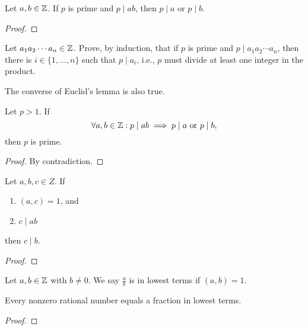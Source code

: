 \documentclass[11pt,a5paper]{article}
\begin{document}
\begin{teo}
    Let \(a,b\in \mathbb{Z}\).
    If \(p\) is prime and \(p\mid ab\), then \(p\mid a\) or \(p\mid b\).
\end{teo}

\begin{proof}
    
\end{proof}

\begin{eje}
    Let \(a_1 a_2 \cdots a_n\in \mathbb{Z}\).
    Prove, by induction, that if \(p\) is prime and \(p\mid a_1 a_2 \cdots a_n\), then there is \(i\in \{1,\ldots,n\}\) such that \(p\mid a_i\), i.e., \(p\) must divide at least one integer in the product.
\end{eje}

The converse of Euclid's lemma is also true.

\begin{prop}
    Let \(p>1\).
    If 
    \[\forall a,b\in \mathbb{Z}  : p\mid ab\implies p\mid a \text{  or  } p\mid b,\]
    then \(p\) is prime.
\end{prop}

\begin{proof}
    By contradiction.
\end{proof}


\begin{prop}
    Let \(a,b,c\in Z\).
    If 
    \begin{enumerate}[label=(\roman*)]
        \item \((a,c) = 1\), and
        \item \(c\mid ab\)
    \end{enumerate}
    then \(c\mid b\).
\end{prop}


\begin{proof}
    
\end{proof}



\begin{defi}
    Let \(a,b\in \mathbb{Z}\) with \(b\neq 0\). We say \(\frac{a}{b}    \) is in lowest terms if \((a,b) = 1\).
\end{defi}

\begin{lem}
    Every nonzero rational number equals a fraction in lowest terms.
\end{lem}

\begin{proof}
    
\end{proof}
\end{document}
